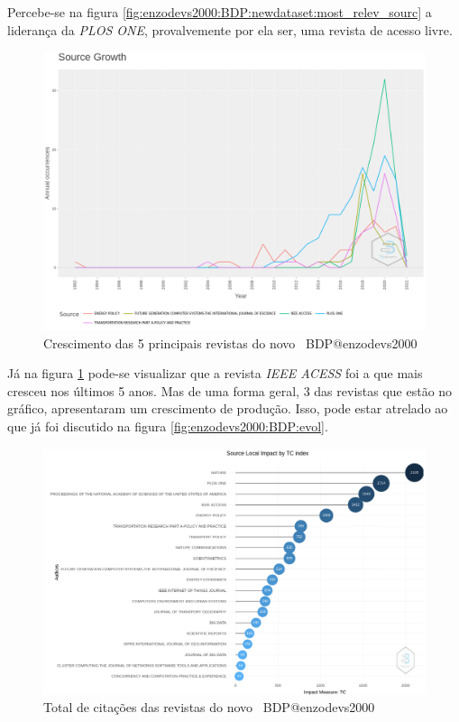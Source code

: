 Percebe-se na figura \ref{fig:enzodevs2000:BDP:newdataset:most_relev_sourc} a liderança da \textit{PLOS ONE}, provalvemente por ela ser, uma revista de acesso livre.

\begin{figure}[H]
    \centering
    \includegraphics[width=1\textwidth]{experiments/enzodevs2000/AnaliseBibliometrica/BigDataInPolicy/Figures/Graficos/NovoDataset/Sources/sourceGrowth.png}
    \caption{Crescimento das 5 principais revistas do novo \dataset\ BDP@enzodevs2000}
    \label{fig:enzodevs2000:BDP:newdataset:source_growth}
\end{figure}

Já na figura \ref{fig:enzodevs2000:BDP:newdataset:source_growth} pode-se visualizar que a revista \textit{IEEE ACESS} foi a que mais cresceu nos últimos 5 anos. Mas de uma forma geral, 3 das revistas que estão no gráfico, apresentaram um crescimento de produção. Isso, pode estar atrelado ao que já foi discutido na figura \ref{fig:enzodevs2000:BDP:evol}.

\begin{figure}[H]
    \centering
    \includegraphics[width=1\textwidth]{experiments/enzodevs2000/AnaliseBibliometrica/BigDataInPolicy/Figures/Graficos/NovoDataset/Sources/totalCitations.png}
    \caption{Total de citações das revistas do novo \dataset\ BDP@enzodevs2000}
    \label{fig:enzodevs2000:BDP:newdataset:total_citations}
\end{figure}

